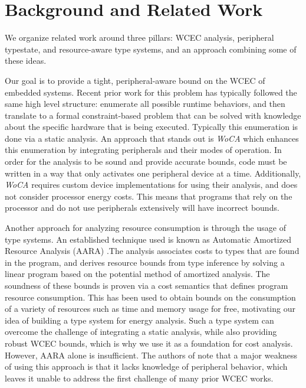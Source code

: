 \documentclass[sigconf, nonacm, screen]{acmart}
\begin{document}
\section{Background and Related Work}
We organize related work around three pillars: WCEC analysis, peripheral typestate, and resource-aware type systems, and an approach combining some of these ideas. 

Our goal is to provide a tight, peripheral-aware bound on the WCEC of embedded systems. Recent prior work for this problem has typically followed the same high level structure: enumerate all possible runtime behaviors, and then translate to a formal constraint-based problem that can be solved with knowledge about the specific hardware that is being executed. \cite{Wagemann2022, raffeck_et_al_OASIcs_WCET_2019_4,wegener_et_al_OASIcs_WCET_2023_9, 8847394} Typically this enumeration is done via a static analysis. An approach that stands out is \textit{WoCA} \cite{woca} which enhances this enumeration by integrating peripherals and their modes of operation. In order for the analysis to be sound and provide accurate bounds, code must be written in a way that only activates one peripheral device at a time. Additionally, \textit{WoCA} requires custom device implementations for using their analysis, and does not consider processor energy costs. This means that programs that rely on the processor and do not use peripherals extensively will have incorrect bounds. 

Another approach for analyzing resource consumption is through the usage of type systems. An established technique used is known as Automatic Amortized Resource Analysis (AARA) \cite{Hoffmann_Jost_2022}.The analysis associates costs to types that are found in the program, and derives resource bounds from type inference by solving a linear program based on the potential method of amortized analysis. The soundness of these bounds is proven via a cost semantics that defines program resource consumption. This has been used to obtain bounds on the consumption of a variety of resources such as time and memory usage for free, motivating our idea of building a type system for energy analysis. Such a type system can overcome the challenge of integrating a static analysis, while also providing robust WCEC bounds, which is why we use it as a foundation for cost analysis. However, AARA alone is insufficient. The authors of \cite{Hoffmann_Jost_2022} note that a major weakness of using this approach is that it lacks knowledge of peripheral behavior, which leaves it unable to address the first challenge of many prior WCEC works.
\end{document}
